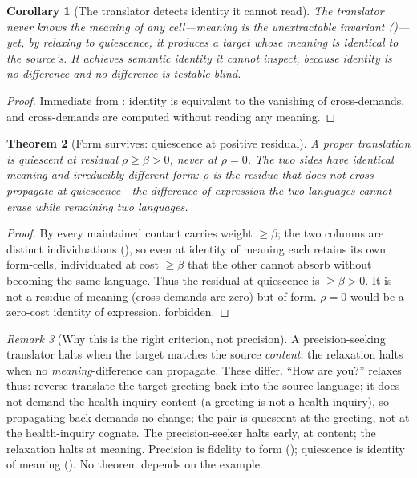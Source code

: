 \documentclass[11pt,a4paper]{article}
\theoremstyle{thmstyle}
\newtheorem{theorem}{Theorem}[section]
\newtheorem{corollary}[theorem]{Corollary}
\theoremstyle{definition}
\theoremstyle{remark}
\newtheorem{remark}[theorem]{Remark}
\newcommand{\flo}{\beta}               %
\newcommand{\res}{\rho}                %
\begin{document}
\begin{corollary}[The translator detects identity it cannot read]
\label{cor:blind}
The translator never knows the meaning of any cell---meaning is the
unextractable invariant ()---yet, by relaxing to quiescence,
it produces a target whose meaning is identical to the source's. It achieves
semantic identity it cannot inspect, because identity is no-difference and
no-difference is testable blind.
\end{corollary}

\begin{proof}
Immediate from : identity is equivalent to the
vanishing of cross-demands, and cross-demands are computed without reading any
meaning.
\end{proof}

\begin{theorem}[Form survives: quiescence at positive residual]
\label{thm:form-residual}
A proper translation is quiescent at residual $\res\ge\flo>0$, never at
$\res=0$. The two sides have identical meaning and irreducibly different
form: $\res$ is the residue that does not cross-propagate at
quiescence---the difference of expression the two languages cannot erase
while remaining two languages.
\end{theorem}

\begin{proof}
By  every maintained contact carries weight $\ge\flo$; the two
columns are distinct individuations (), so even at
identity of meaning each retains its own form-cells, individuated at cost
$\ge\flo$ that the other cannot absorb without becoming the same language.
Thus the residual at quiescence is $\ge\flo>0$. It is not a residue of
meaning (cross-demands are zero) but of form. $\res=0$ would be a zero-cost
identity of expression, forbidden.
\end{proof}

\begin{remark}[Why this is the right criterion, not precision]
\label{rem:right-criterion}
A precision-seeking translator halts when the target matches the source
\emph{content}; the relaxation halts when no \emph{meaning}-difference can
propagate. These differ. ``How are you?'' relaxes thus: reverse-translate the
target greeting back into the source language; it does not demand the
health-inquiry content (a greeting is not a health-inquiry), so propagating
back demands no change; the pair is quiescent at the greeting, not at the
health-inquiry cognate. The precision-seeker halts early, at content; the
relaxation halts at meaning. Precision is fidelity to form
(); quiescence is identity of meaning
(). No theorem depends on the example.
\end{remark}
\end{document}

